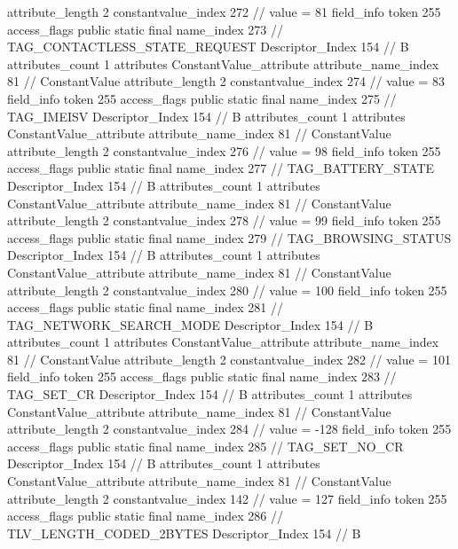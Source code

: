 {{{{{{{					attribute_length	2
					constantvalue_index	272		// value = 81
				}
				}
			}
			field_info {
				token	255
				access_flags	public static final
				name_index	273		// TAG_CONTACTLESS_STATE_REQUEST
				Descriptor_Index	154		// B
				attributes_count	1
				attributes {
				ConstantValue_attribute {
					attribute_name_index	81		// ConstantValue
					attribute_length	2
					constantvalue_index	274		// value = 83
				}
				}
			}
			field_info {
				token	255
				access_flags	public static final
				name_index	275		// TAG_IMEISV
				Descriptor_Index	154		// B
				attributes_count	1
				attributes {
				ConstantValue_attribute {
					attribute_name_index	81		// ConstantValue
					attribute_length	2
					constantvalue_index	276		// value = 98
				}
				}
			}
			field_info {
				token	255
				access_flags	public static final
				name_index	277		// TAG_BATTERY_STATE
				Descriptor_Index	154		// B
				attributes_count	1
				attributes {
				ConstantValue_attribute {
					attribute_name_index	81		// ConstantValue
					attribute_length	2
					constantvalue_index	278		// value = 99
				}
				}
			}
			field_info {
				token	255
				access_flags	public static final
				name_index	279		// TAG_BROWSING_STATUS
				Descriptor_Index	154		// B
				attributes_count	1
				attributes {
				ConstantValue_attribute {
					attribute_name_index	81		// ConstantValue
					attribute_length	2
					constantvalue_index	280		// value = 100
				}
				}
			}
			field_info {
				token	255
				access_flags	public static final
				name_index	281		// TAG_NETWORK_SEARCH_MODE
				Descriptor_Index	154		// B
				attributes_count	1
				attributes {
				ConstantValue_attribute {
					attribute_name_index	81		// ConstantValue
					attribute_length	2
					constantvalue_index	282		// value = 101
				}
				}
			}
			field_info {
				token	255
				access_flags	public static final
				name_index	283		// TAG_SET_CR
				Descriptor_Index	154		// B
				attributes_count	1
				attributes {
				ConstantValue_attribute {
					attribute_name_index	81		// ConstantValue
					attribute_length	2
					constantvalue_index	284		// value = -128
				}
				}
			}
			field_info {
				token	255
				access_flags	public static final
				name_index	285		// TAG_SET_NO_CR
				Descriptor_Index	154		// B
				attributes_count	1
				attributes {
				ConstantValue_attribute {
					attribute_name_index	81		// ConstantValue
					attribute_length	2
					constantvalue_index	142		// value = 127
				}
				}
			}
			field_info {
				token	255
				access_flags	public static final
				name_index	286		// TLV_LENGTH_CODED_2BYTES
				Descriptor_Index	154		// B
}}}}}
